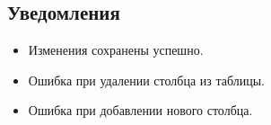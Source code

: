 \documentclass[a4paper,12pt,reqno]{article}
\begin{document}
\subsection{Уведомления}
\begin{itemize}
    \item Изменения сохранены успешно.
    \item Ошибка при удалении столбца из таблицы.
    \item Ошибка при добавлении нового столбца.
\end{itemize}


\printbibliography[title=Список источников, heading=bibintoc]

\newpage
{}


\newpage
\listRegistration
\end{document}
